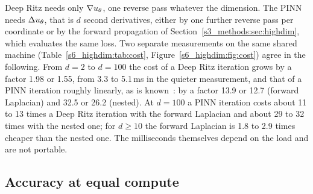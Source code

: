 Deep Ritz needs only $\nabla u_{\theta}$, one reverse pass whatever the dimension. The PINN needs
$\Delta u_{\theta}$, that is $d$ second derivatives, either by one further reverse pass per coordinate
or by the forward propagation of Section~\ref{s3_methods:sec:highdim}, which evaluates the same
loss. Two separate measurements on the same shared machine (Table~\ref{s6_highdim:tab:cost},
Figure~\ref{s6_highdim:fig:cost}) agree in the following.
From $d=2$ to $d=100$ the cost of a Deep Ritz iteration grows by a factor 1.98 or 1.55, from
3.3 to 5.1\,ms in the quieter measurement, and that of a PINN iteration roughly linearly, as is
known~\citep{hu2024}: by a factor 13.9 or 12.7 (forward Laplacian) and 32.5 or 26.2 (nested).
At $d=100$ a PINN iteration costs about 11 to 13 times a Deep Ritz iteration with the forward
Laplacian and about 29 to 32 times with the nested one; for $d\ge10$ the forward Laplacian is
1.8 to 2.9 times cheaper than the nested one. The milliseconds themselves depend on the load
and are not portable.

\subsection{Accuracy at equal compute}\label{s6_highdim:sec:compute}

